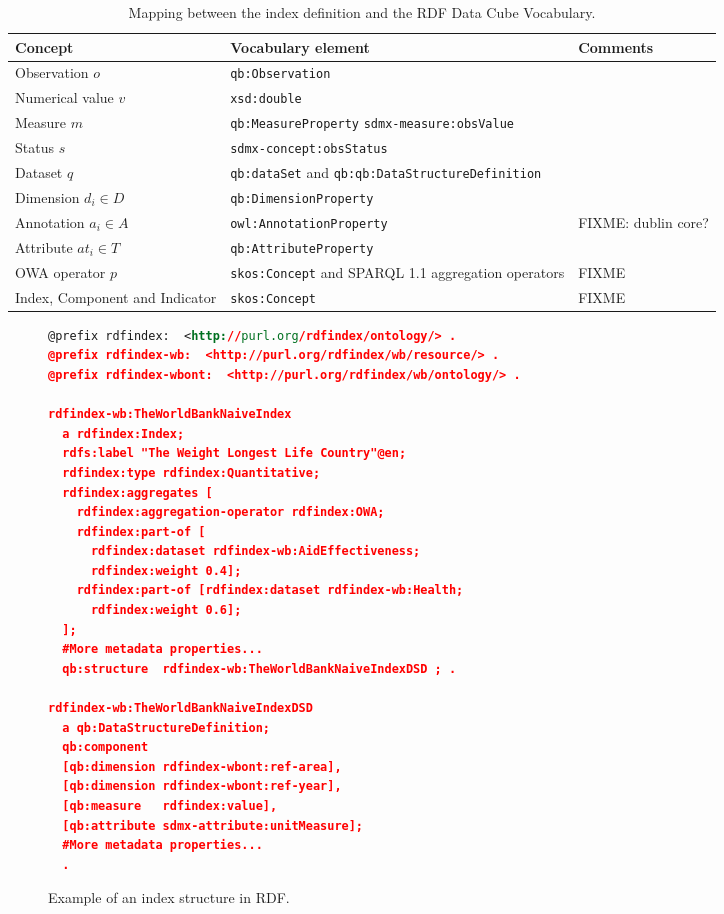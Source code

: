 \documentclass{llncs}
\begin{document}
\begin{table}[!htb]
\renewcommand{\arraystretch}{1.3}
\begin{center}
\begin{tabular}{|p{3cm}||p{6cm}|p{3cm}|}
\hline
  \textbf{Concept} & \textbf{Vocabulary element} &  \textbf{Comments}  \\  \hline
   Observation $o$ & \texttt{qb:Observation} &  \\ \hline
   Numerical value $v$ & \texttt{xsd:double} &  \\ \hline
   Measure $m$ & \texttt{qb:MeasureProperty} \texttt{sdmx-measure:obsValue} &  \\ \hline
   Status $s$ & \texttt{sdmx-concept:obsStatus} &  \\ \hline
   Dataset $q$ & \texttt{qb:dataSet} and \texttt{qb:qb:DataStructureDefinition} &  \\ \hline
   Dimension $d_i \in D$ & \texttt{qb:DimensionProperty} &  \\ \hline
   Annotation $a_i \in A$ & \texttt{owl:AnnotationProperty} &  FIXME: dublin core?\\ \hline
   Attribute $at_i \in T$ & \texttt{qb:AttributeProperty} &  \\ \hline
   OWA operator $p$ &  \texttt{skos:Concept} and SPARQL 1.1 aggregation operators & FIXME \\ \hline
   Index, Component and Indicator & \texttt{skos:Concept} & FIXME \\ \hline
  \hline
  \end{tabular}
  \caption{Mapping between the index definition and the RDF Data Cube Vocabulary.}
  \label{index-to-rdf}
  \end{center}
\end{table} 

\begin{figure}[!ht]
\begin{lstlisting}[language=XML]  
@prefix rdfindex:  <http://purl.org/rdfindex/ontology/> .
@prefix rdfindex-wb:  <http://purl.org/rdfindex/wb/resource/> .
@prefix rdfindex-wbont:  <http://purl.org/rdfindex/wb/ontology/> .

rdfindex-wb:TheWorldBankNaiveIndex 
  a rdfindex:Index;
  rdfs:label "The Weight Longest Life Country"@en;
  rdfindex:type rdfindex:Quantitative;
  rdfindex:aggregates [ 		
    rdfindex:aggregation-operator rdfindex:OWA;
    rdfindex:part-of [
      rdfindex:dataset rdfindex-wb:AidEffectiveness; 
      rdfindex:weight 0.4];
    rdfindex:part-of [rdfindex:dataset rdfindex-wb:Health; 
      rdfindex:weight 0.6];
  ];
  #More metadata properties...
  qb:structure 	rdfindex-wb:TheWorldBankNaiveIndexDSD ; .
  
rdfindex-wb:TheWorldBankNaiveIndexDSD 
  a qb:DataStructureDefinition;  
  qb:component    
  [qb:dimension rdfindex-wbont:ref-area],
  [qb:dimension rdfindex-wbont:ref-year],
  [qb:measure   rdfindex:value],
  [qb:attribute sdmx-attribute:unitMeasure];
  #More metadata properties...
  .
\end{lstlisting}
\caption{Example of an index structure in RDF.}
 \label{fig:results-rdf-index}
\end{figure}
\end{document}
